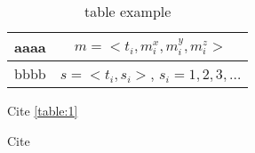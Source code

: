 \begin{table}[!htb]%
  \caption{table example}\label{table:1}
  \begin{center}
    \begin{tabular}{|c|c|}
      \hline
      \hline
      aaaa & $m = <t_i, m^x_i, m^y_i, m^z_i>$ \\
      \hline
      bbbb & $s = <t_i, s_i>$, $s_i = 1, 2, 3,\ldots$ \\
      \hline
      \hline
    \end{tabular}
  \end{center}
\end{table}
Cite \autoref{table:1}

Cite \cite{john00}